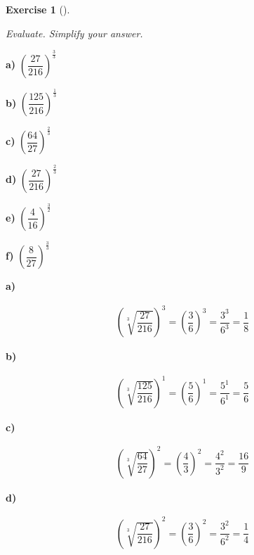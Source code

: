 \documentclass[
  letterpaper,
  DIV=11,
  numbers=noendperiod]{scrreprt}
\theoremstyle{definition}
\newtheorem{exercise}{Exercise}[chapter]
\theoremstyle{remark}
\begin{document}
\begin{exercise}[]\protect\hypertarget{exr-u2-20}{}\label{exr-u2-20}

\emph{Evaluate. Simplify your answer.}

\textbf{a)} \(\displaystyle \left(\dfrac{27}{216}\right)^{\frac{3}{3}}\)

\textbf{b)}
\(\displaystyle \left(\dfrac{125}{216}\right)^{\frac{1}{3}}\)

\textbf{c)} \(\displaystyle \left(\dfrac{64}{27}\right)^{\frac{2}{3}}\)

\textbf{d)} \(\displaystyle \left(\dfrac{27}{216}\right)^{\frac{2}{3}}\)

\textbf{e)} \(\displaystyle \left(\dfrac{4}{16}\right)^{\frac{3}{2}}\)

\textbf{f)} \(\displaystyle \left(\dfrac{8}{27}\right)^{\frac{3}{3}}\)

\begin{tcolorbox}[enhanced jigsaw, opacitybacktitle=0.6, coltitle=black, arc=.35mm, colframe=quarto-callout-tip-color-frame, colback=white, bottomrule=.15mm, left=2mm, colbacktitle=quarto-callout-tip-color!10!white, titlerule=0mm, opacityback=0, title=\textcolor{quarto-callout-tip-color}{\faLightbulb}\hspace{0.5em}{🔍 View Solutions}, leftrule=.75mm, breakable, rightrule=.15mm, bottomtitle=1mm, toptitle=1mm, toprule=.15mm]

\textbf{a)}

\[
\begin{aligned}
\left(\sqrt[3]{\dfrac{27}{216}}\right)^{3}=\left(\dfrac{3}{6}\right)^{3}=\dfrac{3^{3}}{6^{3}}=\dfrac{1}{8}
\end{aligned}
\]

\textbf{b)}

\[
\begin{aligned}
\left(\sqrt[3]{\dfrac{125}{216}}\right)^{1}=\left(\dfrac{5}{6}\right)^{1}=\dfrac{5^{1}}{6^{1}}=\dfrac{5}{6}
\end{aligned}
\]

\textbf{c)}

\[
\begin{aligned}
\left(\sqrt[3]{\dfrac{64}{27}}\right)^{2}=\left(\dfrac{4}{3}\right)^{2}=\dfrac{4^{2}}{3^{2}}=\dfrac{16}{9}
\end{aligned}
\]

\textbf{d)}

\[
\begin{aligned}
\left(\sqrt[3]{\dfrac{27}{216}}\right)^{2}=\left(\dfrac{3}{6}\right)^{2}=\dfrac{3^{2}}{6^{2}}=\dfrac{1}{4}
\end{aligned}
\]


\end{tcolorbox}
\end{exercise}
\end{document}
